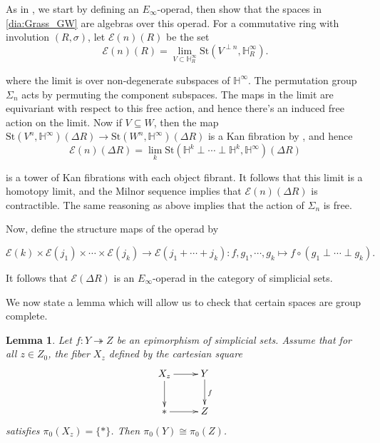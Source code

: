 \documentclass[edeposit,fullpage]{uiucthesis2009}
\newcommand{\mbb}{\mathbb}
\newcommand{\St}{\mathrm{St}}
\theoremstyle{plain}
\newtheorem{lemma}{Lemma}
\numberwithin{lemma}{section}
\theoremstyle{definition}
\begin{document}
As in \cite{SchTri}, we start by defining an $E_\infty$-operad, then
show that the spaces in \ref{dia:Grass_GW} are algebras over this
operad. For a commutative ring with involution $(R,\sigma)$, let $\mathscr
E(n)(R)$ be the set
\[
\mathscr E(n)(R) = \lim_{V \subset \mbb H^\infty_R} \St(V^{\perp n} , \mbb H^\infty_R).
\]

where the limit is over non-degenerate subspaces of $\mbb H^\infty$. The
permutation group $\Sigma_n$ acts by permuting the component
subspaces. The maps in the limit are equivariant with respect to this
free action, and hence there's an induced free action on the
limit. Now if $V \subseteq W$, then the map $\St(V^n,\mbb
H^\infty)(\Delta R) \rightarrow \St(W^n,\mbb H^\infty)(\Delta R)$ is
a Kan fibration by \cite[Proposition A.5]{SchTri}, and hence
\[
\mathscr E(n)(\Delta R) = \lim_k \St(\mbb H^k \perp \cdots \perp \mbb
H^k,\mbb H^\infty)(\Delta R)
\]

is a tower of Kan fibrations with each object fibrant. It follows that
this limit is a homotopy limit, and the Milnor sequence implies that
$\mathscr E(n)(\Delta R)$ is contractible. The same reasoning as above
implies that the action of $\Sigma_n$ is free. 

Now, define the structure maps of the operad by

\[
\mathscr E(k) \times \mathscr E(j_1) \times \cdots \times \mathscr
E(j_k) \rightarrow \mathscr E(j_1 + \cdots + j_k) : f,g_1,\cdots,g_k
\mapsto f \circ (g_1 \perp \cdots \perp g_k).
\]

It follows that $\mathscr E(\Delta R)$ is an $E_\infty$-operad in the
category of simplicial sets.

We now state a lemma which will allow us to check that certain spaces
are group complete.

\begin{lemma}\label{lem:grp_complete_help}
Let $f: Y \twoheadrightarrow Z$ be an epimorphism of simplicial
sets. Assume that for all $z \in Z_0$, the fiber $X_z$ defined by the
cartesian square
\[
\xymatrix{X_z \ar[r] \ar[d]& Y \ar[d]^f \\ \ast \ar[r] & Z}
\]
satisfies $\pi_0(X_z) = \{\ast\}$. Then $\pi_0(Y) \cong \pi_0(Z)$.
\end{lemma}
\end{document}
